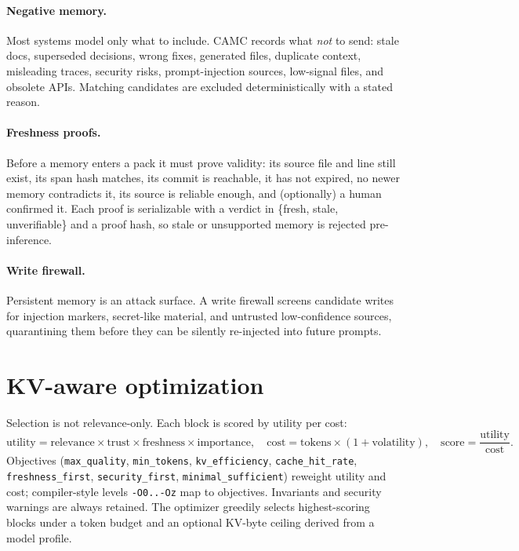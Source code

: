\documentclass[11pt]{article}
\begin{document}
\paragraph{Negative memory.} Most systems model only what to include. CAMC records
what \emph{not} to send: stale docs, superseded decisions, wrong fixes, generated
files, duplicate context, misleading traces, security risks, prompt-injection
sources, low-signal files, and obsolete APIs. Matching candidates are excluded
deterministically with a stated reason.

\paragraph{Freshness proofs.} Before a memory enters a pack it must prove validity:
its source file and line still exist, its span hash matches, its commit is
reachable, it has not expired, no newer memory contradicts it, its source is
reliable enough, and (optionally) a human confirmed it. Each proof is serializable
with a verdict in \{fresh, stale, unverifiable\} and a proof hash, so stale or
unsupported memory is rejected pre-inference.

\paragraph{Write firewall.} Persistent memory is an attack surface. A write firewall
screens candidate writes for injection markers, secret-like material, and untrusted
low-confidence sources, quarantining them before they can be silently re-injected
into future prompts.

\section{KV-aware optimization}
\label{sec:opt}

Selection is not relevance-only. Each block is scored by utility per cost:
\[
\text{utility} = \text{relevance} \times \text{trust} \times \text{freshness} \times \text{importance},
\quad
\text{cost} = \text{tokens} \times (1 + \text{volatility}),
\quad
\text{score} = \frac{\text{utility}}{\text{cost}}.
\]
Objectives (\texttt{max\_quality}, \texttt{min\_tokens}, \texttt{kv\_efficiency},
\texttt{cache\_hit\_rate}, \texttt{freshness\_first}, \texttt{security\_first},
\texttt{minimal\_sufficient}) reweight utility and cost; compiler-style levels
\texttt{-O0..-Oz} map to objectives. Invariants and security warnings are always
retained. The optimizer greedily selects highest-scoring blocks under a token budget
and an optional KV-byte ceiling derived from a model profile.
\end{document}
